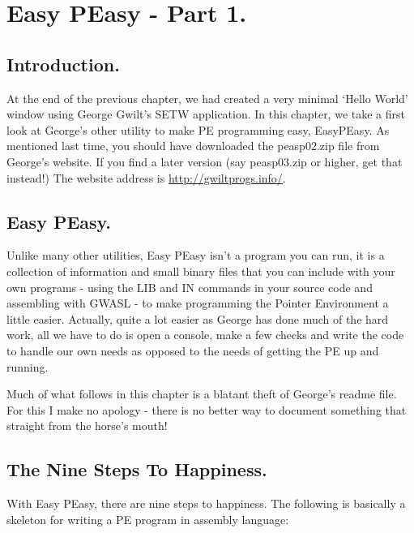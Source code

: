 \chapter{Easy PEasy -{} Part 1.}

\section{Introduction.}
\label{ch25-intro}%

At the end of the previous chapter, we had created a very minimal `Hello
    World' window using George Gwilt's SETW application. In this chapter, we
    take a first look at George's other utility to make PE programming easy,
    EasyPEasy. As mentioned last time, you should have downloaded the
 peasp02.zip file from George's website. If you find a
    later version (say peasp03.zip or higher, get that
    instead!) The website address is \url{http://gwiltprogs.info/}.

\section{Easy PEasy.}
\label{ch25-std-windef-cntd}%

Unlike many other utilities, Easy PEasy isn't a program you can run,
    it is a collection of information and small binary files that you can
    include with your own programs -{} using the LIB and IN commands in your
    source code and assembling with GWASL -{} to make programming the Pointer
    Environment a little easier. Actually, quite a lot easier as George has
    done much of the hard work, all we have to do is open a console, make a
    few checks and write the code to handle our own needs as opposed to the
    needs of getting the PE up and running.

Much of what follows in this chapter is a blatant theft of George's
    readme file. For this I make no apology -{} there is no better way to
    document something that straight from the horse's mouth!

\section{The Nine Steps To Happiness.}

With Easy PEasy, there are nine steps to happiness. The following is
    basically a skeleton for writing a PE program in assembly language:

